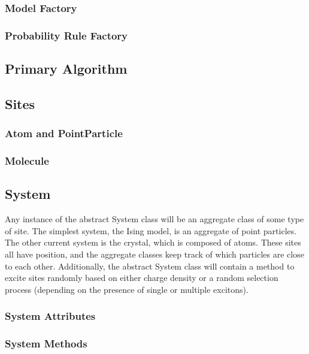 \documentclass{article}
\begin{document}
\subsubsection{Model Factory}

\subsubsection{Probability Rule Factory}




\subsection{Primary Algorithm}




\subsection{Sites}

\subsubsection{Atom and PointParticle}

\subsubsection{Molecule}

\subsection{System}

Any instance of the abstract System class will be an aggregate class of some type of site. The simplest system, the Ising model, is an aggregate of point particles. The other current system is the crystal, which is composed of atoms. These sites all have position, and the aggregate classes keep track of which particles are close to each other. Additionally, the abstract System class will contain a method to excite sites randomly based on either charge density or a random selection process (depending on the presence of single or multiple excitons).

\subsubsection{System Attributes}
\subsubsection{System Methods}
\end{document}
